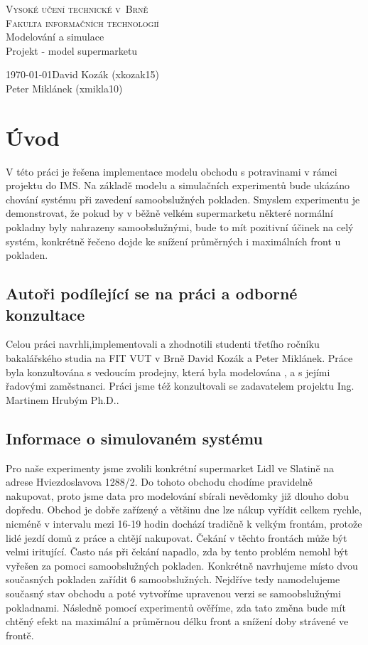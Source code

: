 \documentclass[12pt,a4paper,titlepage]{article}
\begin{document}
\begin{titlepage}
\begin{center}
    {
    	\Huge\textsc{Vysoké učení technické v~Brně}}\\
    \smallskip
    {
    	\huge\textsc{Fakulta informačních technologií}}\\
    \bigskip
    \huge{Modelování a simulace}\\
    \smallskip
    \Huge{Projekt - model supermarketu}\\
\end{center}
    {\Large \today \hfill David Kozák (xkozak15)  }\\
    \smallskip
    {\Large \hfill Peter Miklánek (xmikla10)}
\end{titlepage}

\newpage
\tableofcontents
\newpage

\section{Úvod}
V této práci je řešena implementace modelu obchodu s potravinami v rámci projektu do IMS.
Na základě modelu a simulačních experimentů bude ukázáno chování systému při zavedení samoobslužných pokladen. Smyslem experimentu je demonstrovat, že pokud by v běžně velkém supermarketu některé normální pokladny byly nahrazeny samoobslužnými, bude to mít pozitivní účinek na celý systém, konkrétně řečeno dojde ke snížení průměrných i maximálních front u pokladen.
\subsection{Autoři podílející se na práci a odborné konzultace}
Celou práci navrhli,implementovali a zhodnotili studenti třetího ročníku bakalářského studia na FIT VUT v Brně David Kozák a Peter Miklánek. Práce byla konzultována s vedoucím prodejny, která byla modelována , a s jejími řadovými zaměstnanci.  Práci jsme též konzultovali se zadavatelem projektu Ing. Martinem Hrubým Ph.D..
\subsection{Informace o simulovaném systému}
Pro naše experimenty jsme zvolili konkrétní supermarket Lidl ve Slatině na adrese Hviezdoslavova 1288/2. Do tohoto obchodu chodíme pravidelně nakupovat, proto jsme data pro modelování sbírali nevědomky již dlouho dobu dopředu. Obchod je dobře zařízený a většinu dne lze nákup vyřídit celkem rychle, nicméně v intervalu mezi 16-19 hodin dochází tradičně k velkým frontám, protože lidé jezdí domů z práce a chtějí nakupovat. Čekání v těchto frontách může být velmi iritující. Často nás při čekání napadlo, zda by tento problém nemohl být vyřešen za pomoci samoobslužných pokladen. Konkrétně navrhujeme místo dvou současných pokladen zařídit 6 samoobslužných. Nejdříve tedy namodelujeme současný stav obchodu a poté vytvoříme upravenou verzi se samoobslužnými pokladnami. Následně pomocí experimentů ověříme, zda tato změna bude mít chtěný efekt na maximální a průměrnou délku front a snížení doby strávené ve frontě.
\end{document}
